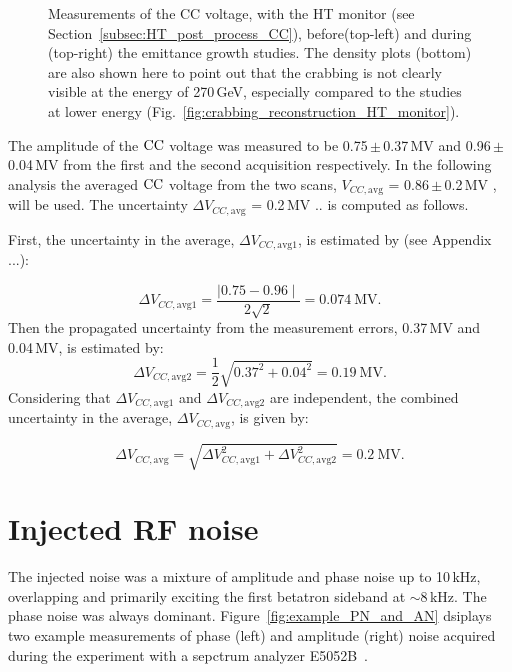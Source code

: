 \begin{figure}[!ht]
\begin{subfigure}[t]{0.45\textwidth}
    \end{subfigure}
    \hfill
     \caption{Measurements of the CC voltage, with the HT monitor (see Section~\ref{subsec:HT_post_process_CC}), before(top-left) and during (top-right) the emittance growth studies. The density plots (bottom) are also shown here to point out that the crabbing is not clearly visible at the energy of 270\,GeV, especially compared to the studies at lower energy (Fig.~\ref{fig:crabbing_reconstruction_HT_monitor}).}
     \label{fig:VCC_MD5_2018} 
\end{figure}

\begin{sloppypar}
The amplitude of the ${\mathrm{CC}}$ voltage was measured to be 0.75\,$\pm$\,0.37\,MV and 0.96\,$\pm$\,0.04\,MV from the first and the second acquisition respectively. In the following analysis the averaged ${\mathrm{CC}}$ voltage from the two scans, $V_{CC, \mathrm{avg}}$ = 0.86\,$\pm$\,0.2\,MV , will be used. The uncertainty  $\Delta V_{CC, \mathrm{avg}}$ = 0.2\,MV .. is computed as follows. 

First, the uncertainty in the average, $\Delta V_{CC, \mathrm{avg1}}$, is estimated by (see Appendix ...): 
\end{sloppypar}
\begin{equation}\label{eq:uncertainty_mean_ws}
    \Delta V_{CC, \mathrm{avg1}} = \frac{\mid 0.75 - 0.96 \mid}{2 \sqrt{2}}=0.074\mathrm{\ MV}.
\end{equation}
Then the propagated uncertainty from the measurement errors, 0.37\,MV and 0.04\,MV, is estimated by:
\begin{equation}\label{eq:propagated_uncertainty_ws}
    \Delta V_{CC, \mathrm{avg2}} = \frac{1}{2}\sqrt{ 0.37^2 + 0.04^2} = 0.19\mathrm{\ MV}.
\end{equation}
Considering that $\Delta V_{CC, \mathrm{avg1}}$ and $\Delta V_{CC, \mathrm{avg2}}$ are independent, the combined uncertainty in the average, $\Delta V_{CC, \mathrm{avg}}$, is given by:

\begin{equation}\label{eq:combined_uncertainty_ws}
    \Delta V_{CC, \mathrm{avg}} = \sqrt{\Delta V_{CC, \mathrm{avg1}} ^2 + \Delta V_{CC, \mathrm{avg2}} ^2}=0.2\mathrm{\ MV}.
\end{equation}


\section{Injected RF noise}\label{sec:noise_meas2018}
\begin{sloppypar} %
 The injected noise was a mixture of amplitude and phase noise up to 10\,kHz, overlapping and primarily exciting the first betatron sideband at $\sim 8$\,kHz. The phase noise was always dominant. Figure~\ref{fig:example_PN_and_AN} dsiplays two example measurements of phase (left) and amplitude (right) noise acquired during the experiment with a sepctrum analyzer E5052B~\cite{E5052B_insight}. 
\end{sloppypar} 

